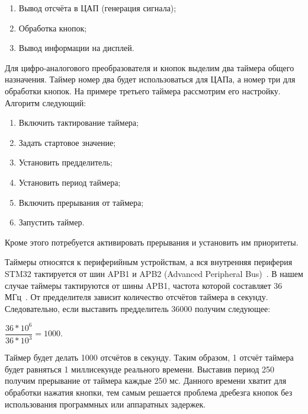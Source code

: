 	\begin{enumerate}
		\item Вывод отсчёта в ЦАП (генерация сигнала);
		\item Обработка кнопок;
		\item Вывод информации на дисплей.
	\end{enumerate}
	
	
	Для цифро-аналогового преобразователя и кнопок выделим два таймера общего назначения. Таймер номер два будет использоваться для ЦАПа, а номер три для обработки кнопок. На примере третьего таймера рассмотрим его настройку. Алгоритм следующий:
	
	\begin{enumerate}
		\item Включить тактирование таймера;
		\item Задать стартовое значение;
		\item Установить предделитель;
		\item Установить период таймера;
		\item Включить прерывания от таймера;
		\item Запустить таймер.
	\end{enumerate}	 
	
	Кроме этого потребуется активировать прерывания и установить им приоритеты.
	
	Таймеры относятся к периферийным устройствам, а вся внутренняя периферия STM32 тактируется от шин APB1 и APB2 (Advanced Peripheral Bus)~\cite{tim}. В нашем случае таймеры тактируются от шины APB1, частота которой составляет 36 МГц~\cite{f103}. От предделителя зависит количество отсчётов таймера в секунду. Следовательно, если выставить предделитель 36000 получим следующее:
	
	\begin{center}
	$\dfrac{36*10^{6}}{36*10^{3}}=1000.$
	\end{center}
	
	Таймер будет делать 1000 отсчётов в секунду. Таким образом, 1 отсчёт таймера будет равняться 1 миллисекунде реального времени. Выставив период 250 получим прерывание от таймера каждые 250 мс. Данного времени хватит для обработки нажатия кнопки, тем самым решается проблема дребезга кнопок без использования программных или аппаратных задержек.
	
